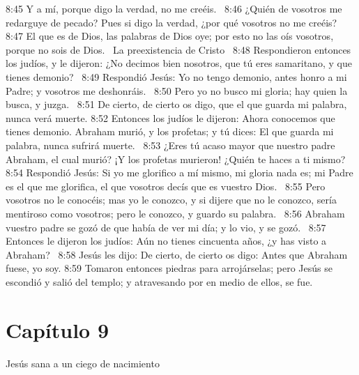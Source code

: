 8:45 Y a mí, porque digo la verdad, no me creéis.  
8:46 ¿Quién de vosotros me redarguye de pecado? Pues si digo la verdad, ¿por qué vosotros no me creéis?  
8:47 El que es de Dios, las palabras de Dios oye; por esto no las oís vosotros, porque no sois de Dios.  
La preexistencia de Cristo  
8:48 Respondieron entonces los judíos, y le dijeron: ¿No decimos bien nosotros, que tú eres samaritano, y que tienes demonio?  
8:49 Respondió Jesús: Yo no tengo demonio, antes honro a mi Padre; y vosotros me deshonráis.  
8:50 Pero yo no busco mi gloria; hay quien la busca, y juzga.  
8:51 De cierto, de cierto os digo, que el que guarda mi palabra, nunca verá muerte. 
8:52 Entonces los judíos le dijeron: Ahora conocemos que tienes demonio. Abraham murió, y los profetas; y tú dices: El que guarda mi palabra, nunca sufrirá muerte.  
8:53 ¿Eres tú acaso mayor que nuestro padre Abraham, el cual murió? ¡Y los profetas murieron! ¿Quién te haces a ti mismo?  
8:54 Respondió Jesús: Si yo me glorifico a mí mismo, mi gloria nada es; mi Padre es el que me glorifica, el que vosotros decís que es vuestro Dios.  
8:55 Pero vosotros no le conocéis; mas yo le conozco, y si dijere que no le conozco, sería mentiroso como vosotros; pero le conozco, y guardo su palabra.  
8:56 Abraham vuestro padre se gozó de que había de ver mi día; y lo vio, y se gozó.  
8:57 Entonces le dijeron los judíos: Aún no tienes cincuenta años, ¿y has visto a Abraham?  
8:58 Jesús les dijo: De cierto, de cierto os digo: Antes que Abraham fuese, yo soy. 
8:59 Tomaron entonces piedras para arrojárselas; pero Jesús se escondió y salió del templo; y atravesando por en medio de ellos, se fue.  
\section*{Capítulo 9 }
Jesús sana a un ciego de nacimiento  

